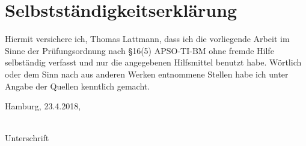 

 \chapter*{Selbstständigkeitserklärung}
 
 Hiermit versichere ich, Thomas Lattmann, dass ich die vorliegende Arbeit im Sinne der Prüfungsordnung nach §16(5) APSO-TI-BM ohne fremde Hilfe selbständig verfasst und nur die angegebenen Hilfsmittel benutzt habe. Wörtlich oder dem Sinn nach aus anderen Werken entnommene Stellen habe ich unter Angabe der Quellen kenntlich gemacht.

 
\vspace{35mm}
\noindent{}Hamburg, 23.4.2018,
\begin{minipage}[t]{8cm}
\centering \dotfill \\
Unterschrift
\end{minipage}



 
%  

